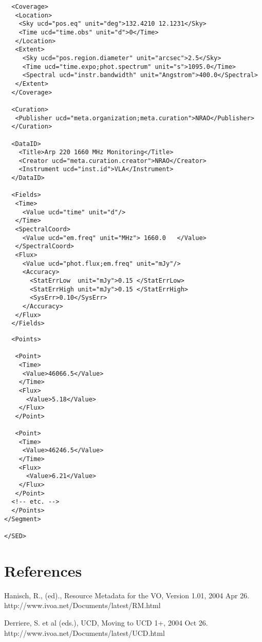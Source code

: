 \documentclass[11pt]{article}
\newenvironment{fmpage}
     {\begin{lrbox}{\fmbox}\begin{minipage}{6.5in}}
     {\end{minipage}\end{lrbox}\colorbox{iblue}{\fbox{\usebox{\fmbox}}}}
\begin{document}
{\begin{flushleft}
\begin{fmpage}
\begin{verbatim}
  <Coverage>
   <Location>
    <Sky ucd="pos.eq" unit="deg">132.4210 12.1231</Sky>
    <Time ucd="time.obs" unit="d">0</Time>
   </Location>
   <Extent>
     <Sky ucd="pos.region.diameter" unit="arcsec">2.5</Sky>
     <Time ucd="time.expo;phot.spectrum" unit="s">1095.0</Time>
     <Spectral ucd="instr.bandwidth" unit="Angstrom">400.0</Spectral>
   </Extent>
  </Coverage>

  <Curation>
   <Publisher ucd="meta.organization;meta.curation">NRAO</Publisher>
  </Curation>

  <DataID>
    <Title>Arp 220 1660 MHz Monitoring</Title>
    <Creator ucd="meta.curation.creator">NRAO</Creator>
    <Instrument ucd="inst.id">VLA</Instrument>
  </DataID>

  <Fields>
   <Time>
     <Value ucd="time" unit="d"/>    
   </Time>
   <SpectralCoord>
     <Value ucd="em.freq" unit="MHz"> 1660.0   </Value>    
   </SpectralCoord>
   <Flux>
     <Value ucd="phot.flux;em.freq" unit="mJy"/>
     <Accuracy>
       <StatErrLow  unit="mJy">0.15 </StatErrLow>
       <StatErrHigh unit="mJy">0.15 </StatErrHigh>
       <SysErr>0.10</SysErr>
     </Accuracy>
   </Flux>
  </Fields>

\end{verbatim}
\end{fmpage}

\begin{fmpage}
\begin{verbatim}
  <Points>

   <Point> 
    <Time>
     <Value>46066.5</Value>
    </Time>
    <Flux>
      <Value>5.18</Value>
    </Flux>
   </Point>

   <Point> 
    <Time>
     <Value>46246.5</Value>
    </Time>
    <Flux>
      <Value>6.21</Value>
    </Flux>
   </Point>
  <!-- etc. -->
  </Points>
</Segment>

</SED>

\end{verbatim}
\end{fmpage}
\end{flushleft}
}


\section*{References}


\vskip 0.1in
\par\noindent
Hanisch, R., (ed)., Resource Metadata for the VO, Version 1.01,
2004 Apr 26.  \\
http://www.ivoa.net/Documents/latest/RM.html

\vskip 0.1in
\par\noindent
Derriere, S. et al (eds.), UCD, Moving to UCD 1+, 2004 Oct 26.
\\
http://www.ivoa.net/Documents/latest/UCD.html
\end{document}
